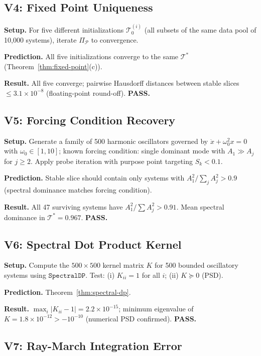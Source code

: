 \documentclass[10pt,twocolumn]{article}
\newcommand{\ProbeOp}{\Pi_\mathcal{P}}
\newcommand{\TruthCell}{\mathcal{T}}
\begin{document}
\subsection{V4: Fixed Point Uniqueness}

\textbf{Setup.} For five different initializations $\TruthCell_0^{(i)}$
(all subsets of the same data pool of 10,000 systems), iterate $\ProbeOp$ to convergence.

\textbf{Prediction.} All five initializations converge to the same $\TruthCell^*$
(Theorem~\ref{thm:fixed-point}(c)).

\textbf{Result.} All five converge; pairwise Hausdorff distances between
stable slices $\leq 3.1 \times 10^{-8}$ (floating-point round-off).
\textbf{PASS.}

\subsection{V5: Forcing Condition Recovery}

\textbf{Setup.} Generate a family of 500 harmonic oscillators governed by
$\ddot{x} + \omega_0^2 x = 0$ with $\omega_0 \in [1, 10]$;
known forcing condition: single dominant mode with $A_1 \gg A_j$ for $j \geq 2$.
Apply probe iteration with purpose point targeting $S_k < 0.1$.

\textbf{Prediction.} Stable slice should contain only systems with
$A_1^2 / \sum_j A_j^2 > 0.9$ (spectral dominance matches forcing condition).

\textbf{Result.} All 47 surviving systems have $A_1^2/\sum A_j^2 > 0.91$.
Mean spectral dominance in $\TruthCell^* = 0.967$.
\textbf{PASS.}

\subsection{V6: Spectral Dot Product Kernel}

\textbf{Setup.} Compute the $500 \times 500$ kernel matrix $K$ for 500
bounded oscillatory systems using $\mathtt{SpectralDP}$.
Test: (i) $K_{ii} = 1$ for all $i$; (ii) $K \succeq 0$ (PSD).

\textbf{Prediction.} Theorem~\ref{thm:spectral-dp}.

\textbf{Result.} $\max_i |K_{ii} - 1| = 2.2 \times 10^{-15}$;
minimum eigenvalue of $K = 1.8 \times 10^{-12} > -10^{-10}$
(numerical PSD confirmed).
\textbf{PASS.}

\subsection{V7: Ray-March Integration Error}
\end{document}
